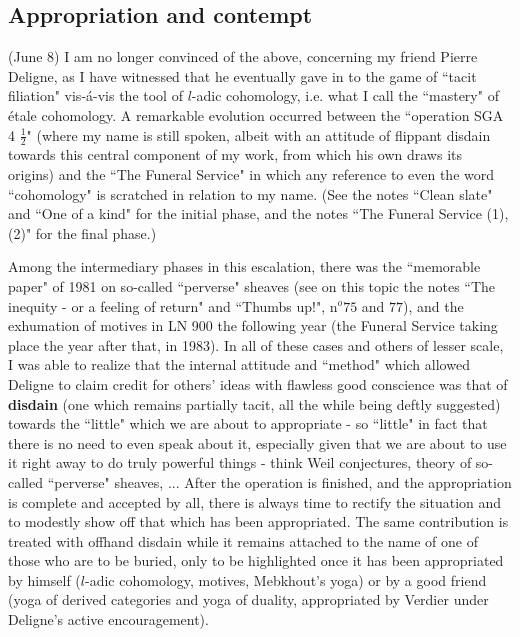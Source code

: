 \subsection{Appropriation and contempt}

\label{note:!59'} (June 8) I am no longer convinced of the above, concerning my friend Pierre Deligne, as I have witnessed that he eventually gave in to the game of ``tacit filiation" vis-\'a-vis the tool of $l$-adic cohomology, i.e. what I call the ``mastery" of \'etale cohomology. A remarkable evolution occurred between the ``operation SGA 4 $\frac{1}{2}$" (where my name is still spoken, albeit with an attitude of flippant disdain towards this central component of my work, from which his own draws its origins) and the ``The Funeral Service" in which any reference to even the word ``cohomology" is scratched in relation to my name. (See the notes ``Clean slate" and ``One of a kind" for the initial phase, and the notes ``The Funeral Service (1), (2)" for the final phase.)

Among the intermediary phases in this escalation, there was the ``memorable paper" of 1981 on so-called ``perverse" sheaves (see on this topic the notes ``The inequity - or a feeling of return" and ``Thumbs up!", n$^o 75$ and $77$), and the exhumation of motives in LN 900 the following year (the Funeral Service taking place the year after that, in 1983). In all of these cases and others of lesser scale, I was able to realize that the internal attitude and ``method" which allowed Deligne to claim credit for others' ideas with flawless good conscience was that of \textbf{disdain} (one which remains partially tacit, all the while being deftly suggested) towards the ``little" which we are about to appropriate - so ``little" in fact that there is no need to even speak about it, especially given that we are about to use it right away to do truly powerful things - think Weil conjectures, theory of so-called ``perverse" sheaves, ... After the operation is finished, and the appropriation is complete and accepted by all, there is always time to rectify the situation and to modestly show off that which has been appropriated. The same contribution is treated with offhand disdain while it remains attached to the name of one of those who are to be buried, only to be highlighted once it has been appropriated by himself ($l$-adic cohomology, motives, Mebkhout's yoga) or by a good friend (yoga of derived categories and yoga of duality, appropriated by Verdier under Deligne's active encouragement).

